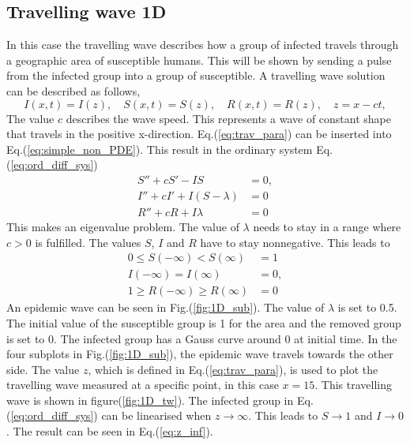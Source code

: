 \documentclass[%
twoside,                 %
final,                   %
chapterprefix=true,      %
open=right               %
10pt]{book}
\begin{document}
\subsection{Travelling wave 1D}
In this case the travelling wave describes how a group of infected travels through a geographic area of susceptible humans. This will be shown by sending a pulse from the infected group into a group of susceptible. A travelling wave solution can be described as follows,
\begin{equation} \label{eq:trav_para}
I(x,t)=I(z),\quad S(x,t)=S(z),\quad R(x,t) = R(z),\quad z = x-ct,
\end{equation}
The value $c$ describes the wave speed. This represents a wave of constant shape that travels in the positive x-direction. Eq.(\ref{eq:trav_para}) can be inserted into Eq.(\ref{eq:simple_non_PDE}). This result in the ordinary system Eq.(\ref{eq:ord_diff_sys})
\begin{equation} \label{eq:ord_diff_sys}
	\begin{aligned}
	S'' + cS' - IS &= 0,\\
	I'' + cI' + I(S-\lambda)&=0\\
	R'' + cR  + I\lambda &=0
	\end{aligned}
\end{equation}
This makes an eigenvalue problem. The value of $\lambda$ needs to stay in a range where $c > 0$ is fulfilled. The values $S$, $I$ and $R$ have to stay nonnegative. This leads to
\begin{equation} 
	\begin{aligned}
	0 \leq S(-\infty) < S(\infty)&=1\\
	I(-\infty)=I(\infty)&=0,\\
	1 \geq R(-\infty)\geq R(\infty) &= 0
	\end{aligned}
\end{equation}
An epidemic wave can be seen in Fig.(\ref{fig:1D_sub}). The value of $\lambda$ is set to 0.5. The initial value of the susceptible group is 1 for the area and the removed group is set to 0. The infected group has a Gauss curve around 0 at initial time. In the four subplots in Fig.(\ref{fig:1D_sub}), the epidemic wave travels towards the other side. The value $z$, which is defined in Eq.(\ref{eq:trav_para}), is used to plot the travelling wave measured at a specific point, in this case $x=15$. This travelling wave is shown in figure(\ref{fig:1D_tw}). The infected group in Eq.(\ref{eq:ord_diff_sys}) can be linearised when $z\rightarrow \infty$. This leads to $S\rightarrow 1$ and $I \rightarrow 0$. The result can be seen in Eq.(\ref{eq:z_inf}). 
\end{document}
